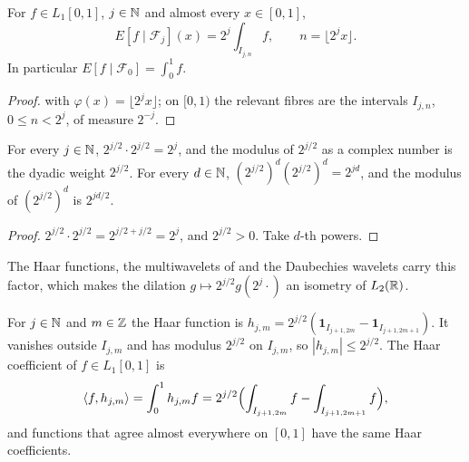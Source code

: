 \begin{lemma}
\label{lem:dyadic-condexp}
\leanok
{}
For $f \in L_1[0, 1]$, $j \in \mathbb{N}$ and almost every $x \in [0, 1]$,
\[
  E[f \mid \mathcal{F}_j](x) = 2^j \int_{I_{j,n}} f , \qquad n = \lfloor 2^j x \rfloor .
\]
In particular $E[f \mid \mathcal{F}_0] = \int_0^1 f$.
\end{lemma}

\begin{proof}
\leanok
{} with $\varphi(x) = \lfloor 2^j x \rfloor$; on $[0, 1)$ the
relevant fibres are the intervals $I_{j,n}$, $0 \leq n < 2^j$, of measure $2^{-j}$.
\end{proof}

\begin{lemma}
\label{lem:dyadic-normalising-factor}
\leanok
{}
For every $j \in \mathbb{N}$, $2^{j/2} \cdot 2^{j/2} = 2^j$, and the modulus of $2^{j/2}$ as a complex
number is the dyadic weight $2^{j/2}$. For every $d \in \mathbb{N}$, $(2^{j/2})^d (2^{j/2})^d = 2^{jd}$,
and the modulus of $(2^{j/2})^d$ is $2^{jd/2}$.
\end{lemma}

\begin{proof}
\leanok
$2^{j/2} \cdot 2^{j/2} = 2^{j/2 + j/2} = 2^j$, and $2^{j/2} > 0$. Take $d$-th powers.
\end{proof}

The Haar functions, the multiwavelets of  and the Daubechies wavelets
carry this factor, which makes the dilation $g \mapsto 2^{j/2} g(2^j \cdot)$ an isometry of
$L_2(\mathbb{R})$.

\begin{definition}
\label{def:haar}
\leanok
{}
For $j \in \mathbb{N}$ and $m \in \mathbb{Z}$ the Haar function is
$h_{j,m} = 2^{j/2} (\mathbf{1}_{I_{j+1,2m}} - \mathbf{1}_{I_{j+1,2m+1}})$. It vanishes outside
$I_{j,m}$ and has modulus $2^{j/2}$ on $I_{j,m}$, so $|h_{j,m}| \leq 2^{j/2}$. The Haar
coefficient of $f \in L_1[0, 1]$ is
\[
  \langle f, h_{j,m} \rangle = \int_0^1 h_{j,m} f
  = 2^{j/2} \Bigl( \int_{I_{j+1,2m}} f - \int_{I_{j+1,2m+1}} f \Bigr) ,
\]
and functions that agree almost everywhere on $[0, 1]$ have the same Haar coefficients.
\end{definition}

